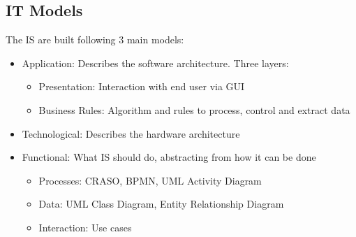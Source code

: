 \documentclass[12pt]{article}
\begin{document}
\subsection{IT Models}
The IS are built following 3 main models:
\begin{itemize}
  \item Application: Describes the software architecture. Three layers:
  \begin{itemize}
    \item Presentation: Interaction with end user via GUI
    \item Business Rules: Algorithm and rules to process, control and extract data
  \end{itemize}
  \item Technological: Describes the hardware architecture
  \item Functional: What IS should do, abstracting from how it can be done
  \begin{itemize}
    \item Processes: CRASO, BPMN, UML Activity Diagram
    \item Data: UML Class Diagram, Entity Relationship Diagram
    \item Interaction: Use cases
  \end{itemize}
\end{itemize}
\end{document}
